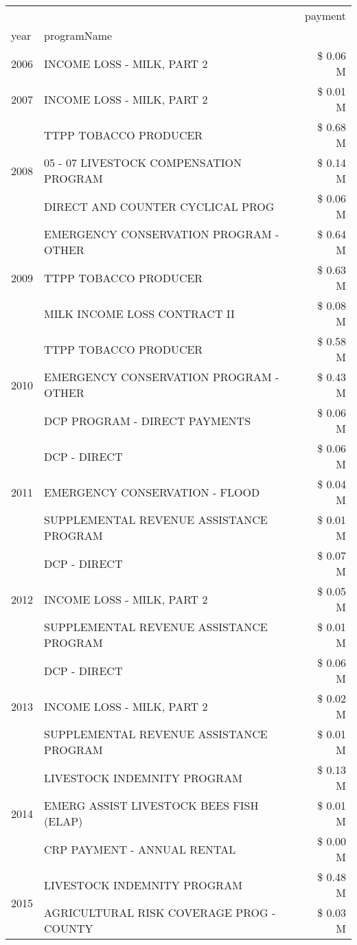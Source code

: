 \begin{tabular}{llr}
\toprule
 &  & payment \\
year & programName &  \\
\midrule
2006 & INCOME LOSS - MILK, PART 2 & \$ 0.06 M \\
\cline{1-3}
2007 & INCOME LOSS - MILK, PART 2 & \$ 0.01 M \\
\cline{1-3}
\multirow[t]{3}{*}{2008} & TTPP TOBACCO PRODUCER & \$ 0.68 M \\
 & 05 - 07 LIVESTOCK COMPENSATION PROGRAM & \$ 0.14 M \\
 & DIRECT AND COUNTER CYCLICAL PROG & \$ 0.06 M \\
\cline{1-3}
\multirow[t]{3}{*}{2009} & EMERGENCY CONSERVATION PROGRAM - OTHER & \$ 0.64 M \\
 & TTPP TOBACCO PRODUCER & \$ 0.63 M \\
 & MILK INCOME LOSS CONTRACT II & \$ 0.08 M \\
\cline{1-3}
\multirow[t]{3}{*}{2010} & TTPP TOBACCO PRODUCER & \$ 0.58 M \\
 & EMERGENCY CONSERVATION PROGRAM - OTHER & \$ 0.43 M \\
 & DCP PROGRAM - DIRECT PAYMENTS & \$ 0.06 M \\
\cline{1-3}
\multirow[t]{3}{*}{2011} & DCP - DIRECT & \$ 0.06 M \\
 & EMERGENCY CONSERVATION - FLOOD & \$ 0.04 M \\
 & SUPPLEMENTAL REVENUE ASSISTANCE PROGRAM & \$ 0.01 M \\
\cline{1-3}
\multirow[t]{3}{*}{2012} & DCP - DIRECT & \$ 0.07 M \\
 & INCOME LOSS - MILK, PART 2 & \$ 0.05 M \\
 & SUPPLEMENTAL REVENUE ASSISTANCE PROGRAM & \$ 0.01 M \\
\cline{1-3}
\multirow[t]{3}{*}{2013} & DCP - DIRECT & \$ 0.06 M \\
 & INCOME LOSS - MILK, PART 2 & \$ 0.02 M \\
 & SUPPLEMENTAL REVENUE ASSISTANCE PROGRAM & \$ 0.01 M \\
\cline{1-3}
\multirow[t]{3}{*}{2014} & LIVESTOCK INDEMNITY PROGRAM & \$ 0.13 M \\
 & EMERG ASSIST LIVESTOCK BEES FISH (ELAP) & \$ 0.01 M \\
 & CRP PAYMENT - ANNUAL RENTAL & \$ 0.00 M \\
\cline{1-3}
\multirow[t]{3}{*}{2015} & LIVESTOCK INDEMNITY PROGRAM & \$ 0.48 M \\
 & AGRICULTURAL RISK COVERAGE PROG - COUNTY & \$ 0.03 M \\

\end{tabular}
